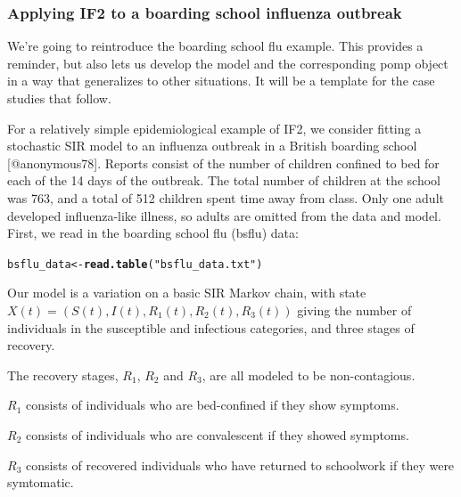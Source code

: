 \documentclass{beamer}\usepackage[]{graphicx}\usepackage[]{color}
\makeatletter
\newcommand{\hlstr}[1]{\textcolor[rgb]{0.192,0.494,0.8}{#1}}%
\newcommand{\hlstd}[1]{\textcolor[rgb]{0.345,0.345,0.345}{#1}}%
\newcommand{\hlkwb}[1]{\textcolor[rgb]{0.69,0.353,0.396}{#1}}%
\newcommand{\hlkwd}[1]{\textcolor[rgb]{0.737,0.353,0.396}{\textbf{#1}}}%
\newenvironment{kframe}{%
 \def\at@end@of@kframe{}%
 \ifinner\ifhmode%
  \def\at@end@of@kframe{\end{minipage}}%
  \begin{minipage}{\columnwidth}%
 \fi\fi%
 \def\FrameCommand##1{\hskip\@totalleftmargin \hskip-\fboxsep
 \colorbox{shadecolor}{##1}\hskip-\fboxsep
     \hskip-\linewidth \hskip-\@totalleftmargin \hskip\columnwidth}%
 \MakeFramed {\advance\hsize-\width
   \@totalleftmargin\z@ \linewidth\hsize
   \@setminipage}}%
 {\par\unskip\endMakeFramed%
 \at@end@of@kframe}
\newenvironment{knitrout}{}{} %
\makeatother
\begin{document}
\begin{frame}[fragile]


\frametitle{Applying IF2 to a boarding school influenza outbreak}

\bi

\item  We're going to reintroduce the boarding school flu example. This provides a reminder, but also lets us develop the model and the corresponding pomp object in a way that generalizes to other situations. It will be a template for the case studies that follow.

\item  For a relatively simple epidemiological example of IF2, we consider fitting a stochastic SIR model to an influenza outbreak in a British boarding school [@anonymous78]. Reports consist of the number of children confined to bed for each of the 14 days of the outbreak. The total number of children at the school was 763, and a total of 512 children spent time away from class. Only one adult developed influenza-like illness, so adults are omitted from the data and model. First, we read in the boarding school flu (bsflu) data:
\ei

\begin{knitrout}\small
{}\color{fgcolor}\begin{kframe}
\begin{alltt}
\hlstd{bsflu_data} \hlkwb{<-} \hlkwd{read.table}\hlstd{(}\hlstr{"bsflu_data.txt"}\hlstd{)}
\end{alltt}
\end{kframe}
\end{knitrout}
\bi

\item  Our model is a variation on a basic SIR Markov chain, with state $X(t)=(S(t),I(t),R_1(t),R_2(t),R_3(t) )$ giving the number of individuals in the susceptible and infectious categories, and three stages of recovery. 

\item  The recovery stages, $R_1$, $R_2$ and $R_3$, are all modeled to be non-contagious. 

\item  $R_1$ consists of individuals who are bed-confined if they show symptoms. 

\item  $R_2$ consists of individuals who are convalescent if they showed symptoms.

\item  $R_3$ consists of recovered individuals who have returned to schoolwork if they were symtomatic.  


\end{frame}
\end{document}
